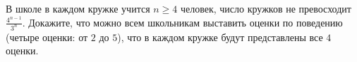 В школе в каждом кружке учится $n \ge 4$ человек, число кружков не превосходит
$\frac{4^{n - 1}}{3^n}$. Докажите, что можно всем школьникам выставить оценки по поведению (четыре
оценки: от $2$ до $5$), что в каждом кружке будут представлены все $4$ оценки.